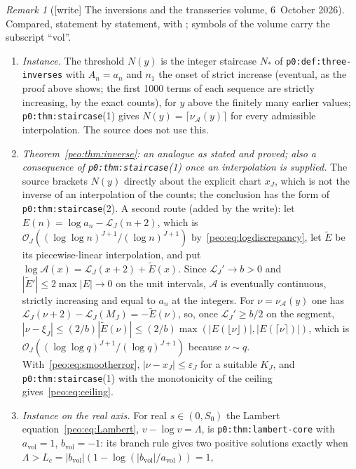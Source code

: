 \documentclass[11pt]{article}
\numberwithin{equation}{section}
\theoremstyle{remark}\newtheorem{remark}[theorem]{Remark}
\newcommand{\Li}{\mathcal L}
\newcommand{\Oh}{\mathcal O}
\newcommand{\file}[1]{\nolinkurl{#1}}
\begin{document}
\begin{remark}[{[write]} The inversions and the transseries volume, 6~October 2026]\label{peo:rem:transseries}
Compared, statement by statement, with
;
symbols of the volume carry the subscript ``vol''.
\begin{enumerate}[label=(\alph*)]
\item \emph{Instance.} The threshold $N(y)$ is the integer staircase $N_\ast$
 of \file{p0:def:three-inverses} with $A_n=a_n$ and $n_1$ the onset of
 strict increase (eventual, as the proof above shows; the first 1000 terms
 of each sequence are strictly increasing, by the exact counts), for $y$
 above the finitely many earlier values; \file{p0:thm:staircase}(1) gives
 $N(y)=\lceil\nu_{\mathcal A}(y)\rceil$ for every admissible interpolation. The
 source does not use this.
\item \emph{Theorem~\ref{peo:thm:inverse}: an analogue as stated and
 proved; also a consequence of \file{p0:thm:staircase}(1) once an
 interpolation is supplied.} The source brackets $N(y)$ directly about the
 explicit chart $x_J$, which is not the inverse of an interpolation of the
 counts; the conclusion has the form of \file{p0:thm:staircase}(2). A second
 route (added by the write): let $E(n)=\log a_n-\Li_J(n+2)$, which
 is $\Oh_J((\log\log n)^{J+1}/(\log n)^{J+1})$
 by~\eqref{peo:eq:logdiscrepancy}, let $\tilde E$ be its piecewise-linear
 interpolation, and put $\log\mathcal A(x)=\Li_J(x+2)+\tilde E(x)$. Since
 $\Li_J'\to b>0$ and $|\tilde E'|\le2\max|E|\to0$ on the unit intervals,
 $\mathcal A$ is eventually continuous, strictly increasing and equal to
 $a_n$ at the integers. For $\nu=\nu_{\mathcal A}(y)$ one has
 $\Li_J(\nu+2)-\Li_J(M_J)=-\tilde E(\nu)$, so, once $\Li_J'\ge b/2$ on the
 segment, $|\nu-\xi_J|\le(2/b)|\tilde E(\nu)|\le(2/b)\max(|E(\lfloor\nu\rfloor)|,|E(\lceil\nu\rceil)|)$,
 which is $\Oh_J((\log\log q)^{J+1}/(\log q)^{J+1})$ because $\nu\sim q$.
 With~\eqref{peo:eq:smootherror}, $|\nu-x_J|\le\varepsilon_J$ for a
 suitable $K_J$, and \file{p0:thm:staircase}(1) with the monotonicity of
 the ceiling gives~\eqref{peo:eq:ceiling}.
\item \emph{Instance on the real axis.} For real $s\in(0,S_0)$ the Lambert
 equation~\eqref{peo:eq:Lambert}, $v-\log v=\Lambda$, is
 \file{p0:thm:lambert-core} with $a_{\mathrm{vol}}=1$, $b_{\mathrm{vol}}=-1$:
 its branch rule gives two positive solutions exactly when
 $\Lambda>L_c=|b_{\mathrm{vol}}|(1-\log(|b_{\mathrm{vol}}|/a_{\mathrm{vol}}))=1$,

\end{enumerate}
\end{remark}
\end{document}
